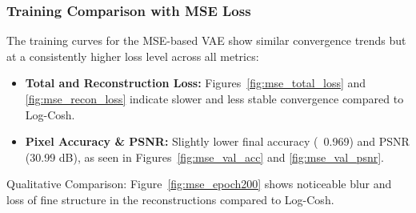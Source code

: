 \subsubsection{Training Comparison with MSE Loss} \label{subsubsec:vae_mse_loss}

The training curves for the MSE-based VAE show similar convergence trends but at a consistently higher loss level across all metrics:

\begin{itemize}
    \item \textbf{Total and Reconstruction Loss:} Figures~\ref{fig:mse_total_loss} and \ref{fig:mse_recon_loss} indicate slower and less stable convergence compared to Log-Cosh.
    \item \textbf{Pixel Accuracy \& PSNR:} Slightly lower final accuracy (~0.969) and PSNR (30.99 dB), as seen in Figures~\ref{fig:mse_val_acc} and \ref{fig:mse_val_psnr}.
\end{itemize}

Qualitative Comparison: Figure~\ref{fig:mse_epoch200} shows noticeable blur and loss of fine structure in the reconstructions compared to Log-Cosh.

